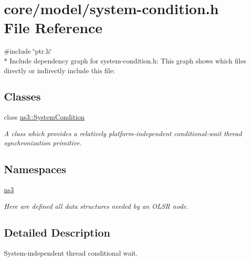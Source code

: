 \hypertarget{system-condition_8h}{}\section{core/model/system-\/condition.h File Reference}
\label{system-condition_8h}
{\ttfamily \#include \char`\"{}ptr.\+h\char`\"{}}\\*
Include dependency graph for system-\/condition.h\+:
This graph shows which files directly or indirectly include this file\+:
\subsection*{Classes}
\begin{DoxyCompactItemize}
\item 
class \hyperlink{classns3_1_1SystemCondition}{ns3\+::\+System\+Condition}
\begin{DoxyCompactList}\small\item\em A class which provides a relatively platform-\/independent conditional-\/wait thread synchronization primitive. \end{DoxyCompactList}\end{DoxyCompactItemize}
\subsection*{Namespaces}
\begin{DoxyCompactItemize}
\item 
 \hyperlink{namespacens3}{ns3}
\begin{DoxyCompactList}\small\item\em Here are defined all data structures needed by an O\+L\+SR node. \end{DoxyCompactList}\end{DoxyCompactItemize}


\subsection{Detailed Description}
System-\/independent thread conditional wait. 